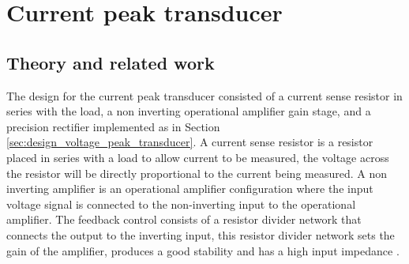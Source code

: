 \chapter{Current peak transducer}
\section{Theory and related work} \label{sec:literature_current_peak_transducer}
The design for the current peak transducer consisted of a current sense resistor in series with the load, a non inverting operational amplifier gain stage, and a precision rectifier implemented as in Section \ref{sec:design_voltage_peak_transducer}. A current sense resistor is a resistor placed in series with a load to allow current to be measured, the voltage across the resistor will be directly proportional to the current being measured. \vspace{4mm} \newline 
A non inverting amplifier is an operational amplifier configuration where the input voltage signal is connected to the non-inverting input to the operational amplifier. The feedback control consists of a resistor divider network that connects the output to the inverting input, this resistor divider network sets the gain of the amplifier, produces a good stability and has a high input impedance \cite{NonInvertingOpAmp}. 


